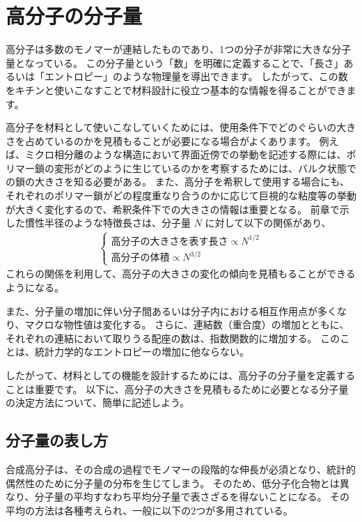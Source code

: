 \documentclass[a4paper,11pt]{ltjsarticle}
\begin{document}
\section{高分子の分子量}

高分子は多数のモノマーが連結したものであり、1つの分子が非常に大きな分子量となっている。
この分子量という「数」を明確に定義することで、「長さ」あるいは「エントロピー」のような物理量を導出できます。
したがって、この数をキチンと使いこなすことで材料設計に役立つ基本的な情報を得ることができます。

高分子を材料として使いこなしていくためには、使用条件下でどのぐらいの大きさを占めているのかを見積もることが必要になる場合がよくあります。
例えば、ミクロ相分離のような構造において界面近傍での挙動を記述する際には、ポリマー鎖の変形がどのように生じているのかを考察するためには、バルク状態での鎖の大きさを知る必要がある。
また、高分子を希釈して使用する場合にも、それぞれのポリマー鎖がどの程度重なり合うのかに応じて巨視的な粘度等の挙動が大きく変化するので、希釈条件下での大きさの情報は重要となる。
前章で示した慣性半径のような特徴長さは、分子量 $N$ に対して以下の関係があり、
\begin{align*}
\begin{cases}
\text{高分子の大きさを表す長さ} \propto N^{1/2} \\[8pt]
\text{高分子の体積} \propto N^{3/2}
\end{cases}
\end{align*}
これらの関係を利用して、高分子の大きさの変化の傾向を見積もることができるようになる。

また、分子量の増加に伴い分子間あるいは分子内における相互作用点が多くなり、マクロな物性値は変化する。
さらに、連結数（重合度）の増加とともに、それぞれの連結において取りうる配座の数は、指数関数的に増加する。
このことは、統計力学的なエントロピーの増加に他ならない。

したがって、材料としての機能を設計するためには、高分子の分子量を定義することは重要です。
以下に、高分子の大きさを見積もるために必要となる分子量の決定方法について、簡単に記述しよう。


\subsection{分子量の表し方}
合成高分子は、その合成の過程でモノマーの段階的な伸長が必須となり、統計的偶然性のために分子量の分布を生じてしまう。
そのため、低分子化合物とは異なり、分子量の平均すなわち平均分子量で表さざるを得ないことになる。
その平均の方法は各種考えられ、一般に以下の2つが多用されている。
\end{document}

